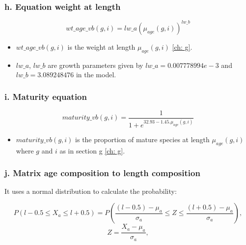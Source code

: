 \documentclass{article}
\begin{document}
\subsubsection{h. Equation weight at length}
\begin{equation}
     wt\_age\_vb(g,i) = lw\_a  \left(\mu_{age}(g,i)\right)^{lw\_b}
 \end{equation}
 \begin{itemize}
     \item $wt\_age\_vb(g,i)$ is the weight at length $\mu_{age}(g,i)$ \ref{ch: g}.
     \item $lw\_a$, $lw\_b$ are growth parameters given by  $lw\_a=0.007778994e-3$ and $lw\_b=3.089248476$ in the model.
 \end{itemize}

\hfill

\subsubsection{i. Maturity equation}
 \begin{equation}
    maturity\_vb(g,i) = \dfrac{1}{1+e^{32.93-1.45.\mu_{age}(g,i)}}
\end{equation}
\begin{itemize}
    \item $maturity\_vb(g,i)$ is the proportion of mature species at length $\mu_{age}(g,i)$ where $g$ and $i$ as in section g \ref{ch: g}.
\end{itemize}

\hfill

\subsubsection{j. Matrix age composition to length composition}

It uses a normal distribution to calculate the probability: 

\begin{equation} \label{eq: page}
    P(l-0.5\leq X_a\leq l+0.5 ) = P\left(\dfrac{(l-0.5)-\mu_a}{\sigma_a}\leq Z\leq\dfrac{(l+0.5)-\mu_a}{\sigma_a}\right),
\end{equation}
\begin{equation*}
    Z = \dfrac{X_a-\mu_a}{\sigma_a},
\end{equation*}
\end{document}
